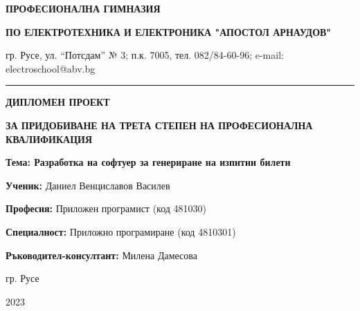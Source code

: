 \addtocounter{page}{-1}

\begin{center}
\begin{footnotesize}
\textbf{ПРОФЕСИОНАЛНА ГИМНАЗИЯ}

\textbf{ПО ЕЛЕКТРОТЕХНИКА И ЕЛЕКТРОНИКА "АПОСТОЛ АРНАУДОВ"}

гр. Русе, ул. “Потсдам” № 3; п.к. 7005, тел. 082/84-60-96;  e-mail:  electroschool@abv.bg
\end{footnotesize}
\end{center}

\par\noindent\rule{\textwidth}{0.4pt}

\hfill \break

\begin{center}

\begin{huge}
\textbf{ДИПЛОМЕН ПРОЕКТ}
\end{huge}

\hfill

\begin{small}
\textbf{ЗА ПРИДОБИВАНЕ НА ТРЕТА СТЕПЕН НА ПРОФЕСИОНАЛНА КВАЛИФИКАЦИЯ}
\end{small}

\hfill \break

\hfill \break

\hfill \break

\hfill \break

\hfill \break

\begin{LARGE}
\textbf{Тема: Разработка на софтуер за генериране на изпитни билети}
\end{LARGE}

\end{center}

\vspace*{\fill}

\textbf{Ученик:}
Даниел Венциславов Василев

\textbf{Професия:}
Приложен програмист (код 481030)

\textbf{Специалност:}
Приложно програмиране (код 4810301)

\hfill

\textbf{Ръководител-консултант:}
Милена Дамесова

\hfill

\hfill

\begin{center}
гр. Русе

2023
\end{center}

\thispagestyle{empty}
